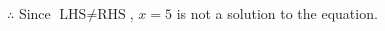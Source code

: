 \documentclass[12pt]{article}
\begin{document}
\begin{multicols}{2}
\begin{minipage}[t]{0.40\textwidth}
    \noindent \(\therefore\) Since \(\text{LHS} \neq \text{RHS}\), \(x = 5\) is not  a solution to the equation.

\end{minipage}

 \vspace*{16pt}
\newpage
    
\end{multicols}
\end{document}
